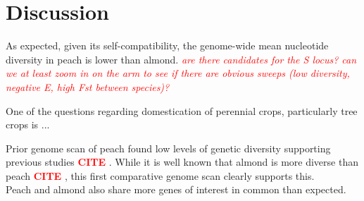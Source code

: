 \documentclass[12pt]{article}
\newcommand{\citex}{\textcolor{red}{\bf CITE }}
\newcommand{\jri}[1]{\textcolor{red}{\emph{#1}}}
\begin{document}
\section*{Discussion}
As expected, given its self-compatibility, the genome-wide mean nucleotide diversity in peach is lower than almond. \jri{are there candidates for the S locus? can we at least zoom in on the arm to see if there are obvious sweeps (low diversity, negative E, high Fst between species)?}

One of the questions regarding domestication of perennial crops, particularly tree crops is ...

Prior genome scan of peach found low levels of genetic diversity \citep{verde2013high, cao2014comparative} supporting previous studies \citex.
%
While it is well known that almond is more diverse than peach \citex, this first comparative genome scan clearly supports this.
%
\\
Peach and almond also share more genes of interest in common than expected.
%
\end{document}
